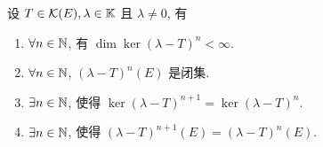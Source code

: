     \begin{Theorem}\label{thm:lambda-T的性质}
        设 $ T\in\mathcal{K}(E), \lambda\in\mathbb{K} $ 且 $ \lambda\ne0 $, 有
        \begin{enumerate}[(1)]
            \item $ \forall n\in\mathbb{N} $, 有 $ \dim\ker(\lambda-T)^{n}<\infty $.
            \item $ \forall n\in\mathbb{N} $, $ (\lambda-T)^{n}(E) $ 是闭集.
            \item $ \exists n\in\mathbb{N} $, 使得 $ \ker(\lambda-T)^{n+1}=\ker(\lambda-T)^{n} $.
            \item $ \exists n\in\mathbb{N} $, 使得 $ (\lambda-T)^{n+1}(E)=(\lambda-T)^{n}(E) $.
        \end{enumerate}
    \end{Theorem}

